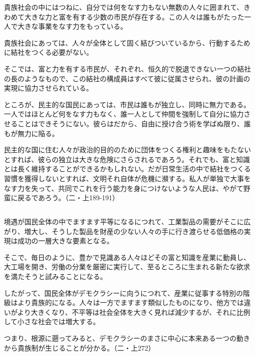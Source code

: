 貴族社会の中にはつねに、自分では何をなす力もない無数の人々に囲まれて、きわめて大きな力と富を有する少数の市民が存在する。この人々は誰もがたった一人で大きな事業をなす力をもっている。

貴族社会にあっては、人々が全体として固く結びついているから、行動するために結社をつくる必要がない。

そこでは、富と力を有する市民が、それぞれ、恒久的で脱退できない一つの結社の長のようなもので、この結社の構成員はすべて彼に従属させられ、彼の計画の実現に協力させられている。

ところが、民主的な国民にあっては、市民は誰もが独立し、同時に無力である。一人ではほとんど何をなす力もなく、誰一人として仲間を強制して自分に協力させることはできそうにない。彼らはだから、自由に授け合う術を学ばぬ限り、誰もが無力に陥る。

民主的な国に住む人々が政治的目的のために団体をつくる権利と趣味をもたないとすれば、彼らの独立は大きな危険にさらされるであろう。それでも、富と知識とは長く維持することができるかもしれない。だが日常生活の中で結社をつくる習慣を獲得しないとすれば、文明それ自体が危機に瀕する。私人が単独で大事をなす力を失って、共同でこれを行う能力を身につけないような人民は、やがて野蛮に戻るであろう。（二・上189-191）

\subsection{}


境遇が国民全体の中でますます平等になるにつれて、工業製品の需要がそこに広がり、増大し、そうした製品を財産の少ない人々の手に行き渡らせる低価格の実現は成功の一層大きな要素となる。

そこで、毎日のように、豊かで見識ある人々ほどその富と知識を産業に動員し、大工場を開き、労働の分業を厳密に実行して、至るところに生まれる新たな欲求を満たそうと試みることになる。

したがって、国民全体がデモクラシーに向うにつれて、産業に従事する特別の階級はより貴族的になる。人々は一方でますます類似したものになり、他方では違いがより大きくなり、不平等は社会全体を大きく見れば減少するが、それに比例して小さな社会では増大する。

つまり、根源に遡ってみると、デモクラシーのまさに中心に本来ある一つの動きから貴族制が生じることが分かる。（二・上272）


\subsection{}



